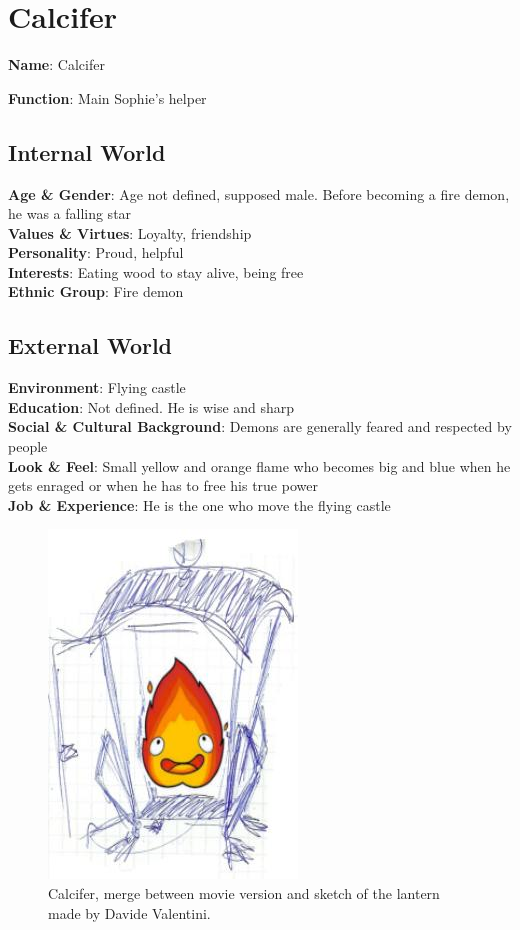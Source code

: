 \section{Calcifer}

\begin{minipage}{0.5\textwidth}
\textbf{Name}: Calcifer

\textbf{Function}: Main Sophie's helper

\subsection{Internal World}

\textbf{Age \& Gender}: Age not defined, supposed male. Before becoming a fire demon, he was a falling star \\
\textbf{Values \& Virtues}: Loyalty, friendship \\
\textbf{Personality}: Proud, helpful \\
\textbf{Interests}: Eating wood to stay alive, being free \\
\textbf{Ethnic Group}: Fire demon

\subsection{External World}
\textbf{Environment}: Flying castle \\
\textbf{Education}: Not defined. He is wise and sharp \\
\textbf{Social \& Cultural Background}: Demons are generally feared and respected by people \\
\textbf{Look \& Feel}: Small yellow and orange flame who becomes big and  blue when he gets enraged or when he has to free his true power\\
\textbf{Job \& Experience}: He is the one who move the flying castle \\

\end{minipage}%
%
\hfill\begin{minipage}{0.4\textwidth}
  \begin{figure}[H]
    \includegraphics{Images/Characters/calcifer_portrait}
    \caption{Calcifer, merge between movie version and sketch of the lantern made by Davide Valentini.}
\end{figure}
\end{minipage}


